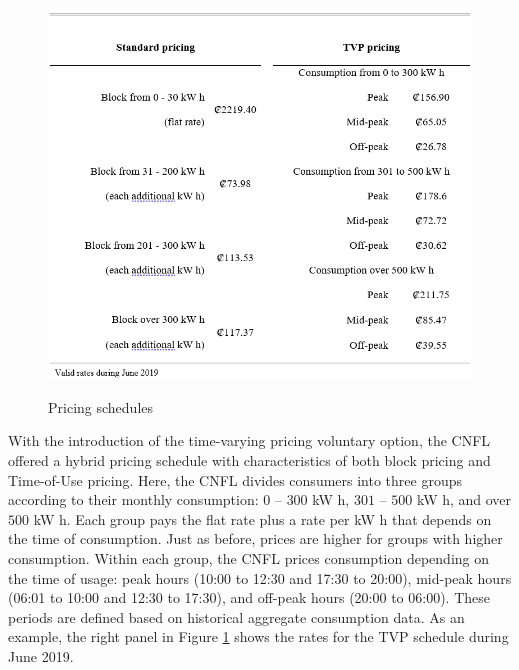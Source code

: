 \documentclass[12pt]{article}
\begin{document}
\begin{figure}[ht]
  \caption{Pricing schedules}\label{fig:table1}
  \begin{center}
  {\includegraphics[width=1\textwidth]{./figures/table1.png}}
  \end{center}
\end{figure}

With the introduction of the time-varying pricing voluntary option, the CNFL offered a hybrid pricing schedule with characteristics of both block pricing and Time-of-Use pricing. Here, the CNFL divides consumers into three groups according to their monthly consumption: $0$ – $300$ kW h, $301$ – $500$ kW h, and over $500$ kW h. Each group pays the flat rate plus a rate per kW h that depends on the time of consumption. Just as before, prices are higher for groups with higher consumption. Within each group, the CNFL prices consumption depending on the time of usage: peak hours (10:00 to 12:30 and 17:30 to 20:00), mid-peak hours (06:01 to 10:00 and 12:30 to 17:30), and off-peak hours (20:00 to 06:00). These periods are defined based on historical aggregate consumption data. As an example, the right panel in Figure \ref{fig:table1} shows the rates for the TVP schedule during June 2019.
\end{document}
